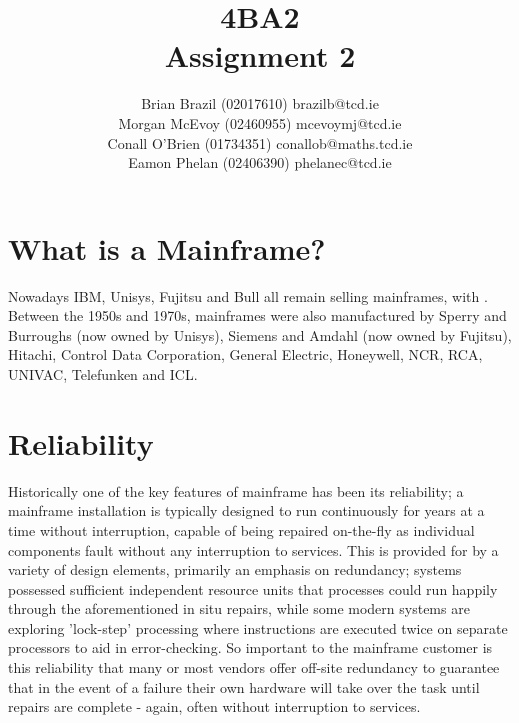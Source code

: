 \documentclass[a4paper,12pt]{article}
\begin{document}


\title{4BA2 \\ Assignment 2}

\author{Brian Brazil (02017610) brazilb@tcd.ie \\  Morgan McEvoy
(02460955) mcevoymj@tcd.ie \\ Conall O'Brien (01734351)
conallob@maths.tcd.ie \\ Eamon Phelan (02406390) phelanec@tcd.ie}

\maketitle

\section{What is a Mainframe?}

\cite[Mainframes (often colloquially referred to as big iron) are large and 
``expensive'' computers used mainly by government institutions and 
large companies for mission critical applications, typically bulk data 
processing such as censuses, industry/consumer statistics, ERP, and 
financial transaction processing]{m1}


Nowadays IBM, Unisys, Fujitsu and Bull all remain selling mainframes,
with \cite[IBM mainframes dominating the market at over 90\%]{m1}.
Between the 1950s and 1970s, mainframes were also manufactured by 
Sperry and Burroughs (now owned by Unisys), Siemens and Amdahl (now 
owned by Fujitsu), Hitachi, Control Data Corporation, General Electric, 
Honeywell, NCR, RCA, UNIVAC, Telefunken and ICL. \cite [ IBM's 
dominance grew out of their development of the 360 series mainframes; 
this basic architecture has continued to evolve into their current 
zSeries/z9 mainframe, which is arguably the only mainframe architecture 
still extant that dates from this early period.]{m1}

\section{Reliability}

Historically one of the key features of mainframe has been its reliability; a
mainframe installation is typically designed to run continuously for years at a
time without interruption, capable of being repaired on-the-fly as individual
components fault without any interruption to services. This is provided for by
a variety of design elements, primarily an emphasis on redundancy; systems
possessed sufficient independent resource units that processes could run
happily through the aforementioned in situ repairs, while some modern systems
are exploring 'lock-step' processing where instructions are executed twice on
separate processors to aid in error-checking. So important to the mainframe
customer is this reliability that many or most vendors offer off-site
redundancy to guarantee that in the event of a failure their own hardware will
take over the task until repairs are complete - again, often without
interruption to services.
\end{document}
